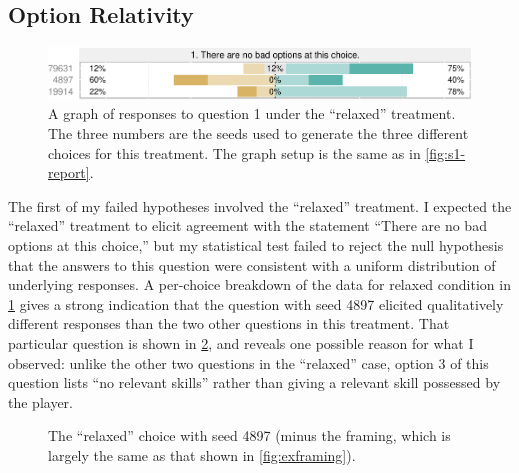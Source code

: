 \subsection{Option Relativity}


\begin{figure}[!h]
  \includegraphics[width=\textwidth]{fig/relaxed-q1.pdf}
  \caption{A graph of responses to question 1 under the ``relaxed'' treatment. The three numbers are the seeds used to generate the three different choices for this treatment. The graph setup is the same as in \cref{fig:s1-report}.}
  \label{fig:relaxedq1}
\end{figure}


The first of my failed hypotheses involved the ``relaxed'' treatment.
%
I expected the ``relaxed'' treatment to elicit agreement with the statement ``There are no bad options at this choice,'' but my statistical test failed to reject the null hypothesis that the answers to this question were consistent with a uniform distribution of underlying responses.
%
A per-choice breakdown of the data for relaxed condition in \cref{fig:relaxedq1} gives a strong indication that the question with seed 4897 elicited qualitatively different responses than the two other questions in this treatment.
%
That particular question is shown in \cref{fig:ch4897}, and reveals one possible reason for what I observed: unlike the other two questions in the ``relaxed'' case, option 3 of this question lists ``no relevant skills'' rather than giving a relevant skill possessed by the player.


\begin{figure}[!h]
\centering
{}
  \caption{The ``relaxed'' choice with seed 4897 (minus the framing, which is largely the same as that shown in \cref{fig:exframing}).}
  \label{fig:ch4897}
\end{figure}


